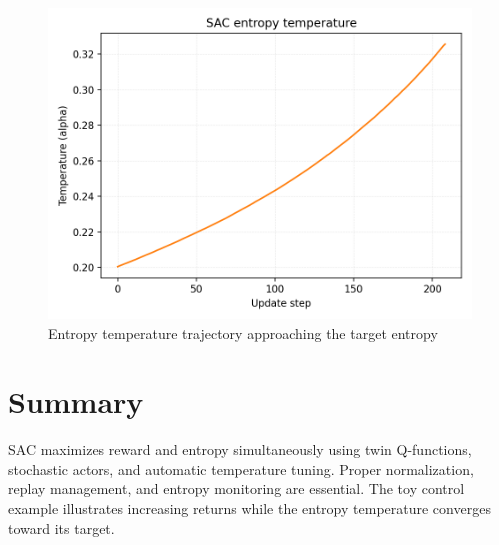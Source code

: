 ﻿\documentclass[12pt]{article}
\begin{document}
\begin{figure}[H]
  \centering
  \includegraphics[width=0.82\linewidth]{sac_temperature.png}
  \caption{Entropy temperature trajectory approaching the target entropy}
  \label{fig:sac_temperature}
\end{figure}

\FloatBarrier
\section{Summary}
SAC maximizes reward and entropy simultaneously using twin Q-functions, stochastic actors, and automatic temperature tuning. Proper normalization, replay management, and entropy monitoring are essential. The toy control example illustrates increasing returns while the entropy temperature converges toward its target.
\end{document}
